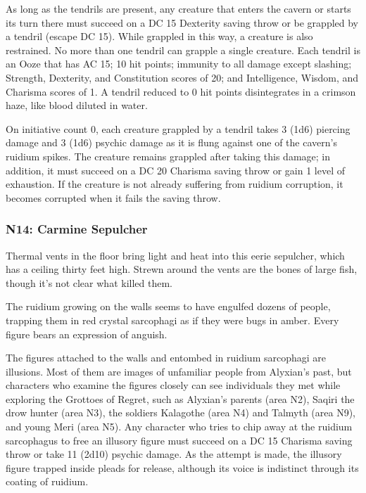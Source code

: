\documentclass[10pt,a4paper,twoside,twocolumn,openany,nodeprecatedcode]{dndbook}
\begin{document}
As long as the tendrils are present, any creature that enters the cavern or starts its turn there must succeed on a DC 15 Dexterity saving throw or be grappled by a tendril (escape DC 15). While grappled in this way, a creature is also restrained. No more than one tendril can grapple a single creature. Each tendril is an Ooze that has AC 15; 10 hit points; immunity to all damage except slashing; Strength, Dexterity, and Constitution scores of 20; and Intelligence, Wisdom, and Charisma scores of 1. A tendril reduced to 0 hit points disintegrates in a crimson haze, like blood diluted in water.

On initiative count 0, each creature grappled by a tendril takes 3 (1d6) piercing damage and 3 (1d6) psychic damage as it is flung against one of the cavern's ruidium spikes. The creature remains grappled after taking this damage; in addition, it must succeed on a DC 20 Charisma saving throw or gain 1 level of exhaustion. If the creature is not already suffering from ruidium corruption, it becomes corrupted when it fails the saving throw.

\subsubsection{N14: Carmine Sepulcher}
\begin{DndReadAloud}{}
Thermal vents in the floor bring light and heat into this eerie sepulcher, which has a ceiling thirty feet high. Strewn around the vents are the bones of large fish, though it's not clear what killed them.

The ruidium growing on the walls seems to have engulfed dozens of people, trapping them in red crystal sarcophagi as if they were bugs in amber. Every figure bears an expression of anguish.

\end{DndReadAloud}

The figures attached to the walls and entombed in ruidium sarcophagi are illusions. Most of them are images of unfamiliar people from Alyxian's past, but characters who examine the figures closely can see individuals they met while exploring the Grottoes of Regret, such as Alyxian's parents (area N2), Saqiri the drow hunter (area N3), the soldiers Kalagothe (area N4) and Talmyth (area N9), and young Meri (area N5). Any character who tries to chip away at the ruidium sarcophagus to free an illusory figure must succeed on a DC 15 Charisma saving throw or take 11 (2d10) psychic damage. As the attempt is made, the illusory figure trapped inside pleads for release, although its voice is indistinct through its coating of ruidium.
\end{document}
